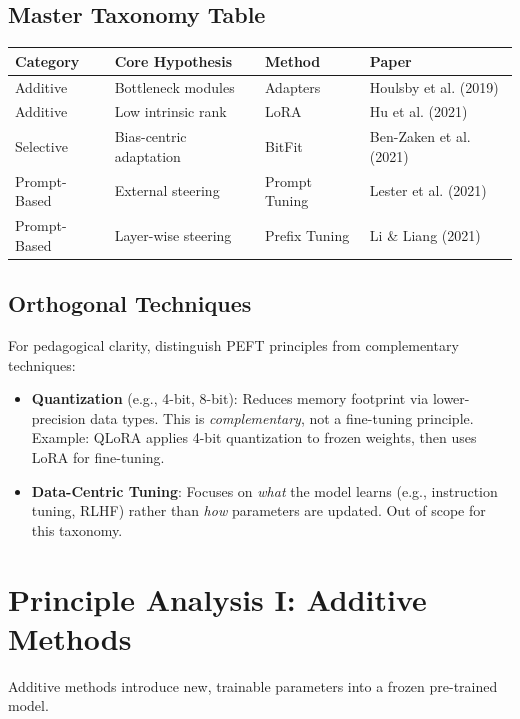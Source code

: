 \documentclass{article}
\begin{document}
\subsection{Master Taxonomy Table}

\begin{center}
\begin{tabular}{llll}
\toprule
\textbf{Category} & \textbf{Core Hypothesis} & \textbf{Method} & \textbf{Paper} \\
\midrule
Additive & Bottleneck modules & Adapters & Houlsby et al. (2019) \\
Additive & Low intrinsic rank & LoRA & Hu et al. (2021) \\
Selective & Bias-centric adaptation & BitFit & Ben-Zaken et al. (2021) \\
Prompt-Based & External steering & Prompt Tuning & Lester et al. (2021) \\
Prompt-Based & Layer-wise steering & Prefix Tuning & Li \& Liang (2021) \\
\bottomrule
\end{tabular}
\end{center}

\subsection{Orthogonal Techniques}

For pedagogical clarity, distinguish PEFT principles from complementary techniques:

\begin{itemize}
\item \textbf{Quantization} (e.g., 4-bit, 8-bit): Reduces memory footprint via lower-precision data types. This is \textit{complementary}, not a fine-tuning principle. Example: QLoRA applies 4-bit quantization to frozen weights, then uses LoRA for fine-tuning.

\item \textbf{Data-Centric Tuning}: Focuses on \textit{what} the model learns (e.g., instruction tuning, RLHF) rather than \textit{how} parameters are updated. Out of scope for this taxonomy.
\end{itemize}

\section{Principle Analysis I: Additive Methods}

Additive methods introduce new, trainable parameters into a frozen pre-trained model.
\end{document}
